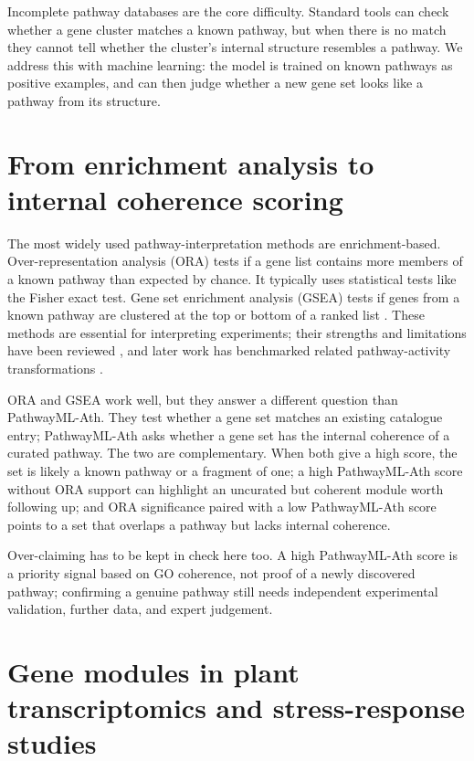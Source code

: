 \documentclass[12pt,letterpaper,oneside,openany]{book}
\begin{document}
Incomplete pathway databases are the core difficulty. Standard tools can check whether a gene cluster matches a known pathway, but when there is no match they cannot tell whether the cluster's internal structure resembles a pathway. We address this with machine learning: the model is trained on known pathways as positive examples, and can then judge whether a new gene set looks like a pathway from its structure.

\section{From enrichment analysis to internal coherence scoring}
\label{sec:bg_enrichment_vs_coherence}

The most widely used pathway-interpretation methods are enrichment-based. Over-representation analysis (ORA) tests if a gene list contains more members of a known pathway than expected by chance. It typically uses statistical tests like the Fisher exact test. Gene set enrichment analysis (GSEA) tests if genes from a known pathway are clustered at the top or bottom of a ranked list \citep{subramanian2005gsea}. These methods are essential for interpreting experiments; their strengths and limitations have been reviewed \citep{khatri2012ten}, and later work has benchmarked related pathway-activity transformations \citep{zhang2020pathway}.

ORA and GSEA work well, but they answer a different question than PathwayML-Ath. They test whether a gene set matches an existing catalogue entry; PathwayML-Ath asks whether a gene set has the internal coherence of a curated pathway. The two are complementary. When both give a high score, the set is likely a known pathway or a fragment of one; a high PathwayML-Ath score without ORA support can highlight an uncurated but coherent module worth following up; and ORA significance paired with a low PathwayML-Ath score points to a set that overlaps a pathway but lacks internal coherence.

Over-claiming has to be kept in check here too. A high PathwayML-Ath score is a priority signal based on GO coherence, not proof of a newly discovered pathway; confirming a genuine pathway still needs independent experimental validation, further data, and expert judgement.

\section{Gene modules in plant transcriptomics and stress-response studies}
\label{sec:bg_plant_modules}
\end{document}
